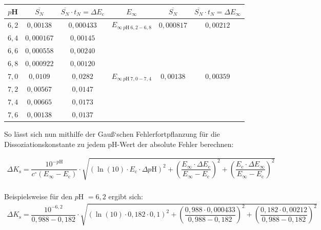 \documentclass[12pt,a4paper,titlepage,headinclude,bibtotoc]{scrartcl}
\begin{document}
\begin{table} [h]
\centering
\begin{tabular} {|c|c|c||c|c|c|}
  \hline
  $p$H & $\overline{S_N}$ & $\overline{S_N} \cdot t_{N} = \Delta E_{\mathrm{c}} $ & $E_{\infty}$ & $\overline{S_N}$ & $\overline{S_N} \cdot t_{N} = \Delta E_{\infty} $ \\\hline\hline
  $6,2$ & $0,00138$& $0,000433$&$E_{\infty {~}p\mathrm{H}{~} 6,2-6,8}$ &$0,000817$ & $0,00212$\\
  $6,4$& $0,000167$& $0,00145$&&& \\
  $6,6$& $0,000558$& $0,00240$&&&\\
  $6,8$& $0,000922$&$0,00120$&&&\\\hline\hline
  $7,0$& $0,0109$& $0,0282$ &$E_{\infty {~}p\mathrm{H}{~} 7,0-7,4}$&$0,00138$& $0,00359$\\
  $7,2$& $0,00567$& $0,0147$&&&\\
  $7,4$& $0,00665$&$0,0173$&&&\\
  $7,6$& $0,00138$&$0,0137$&&&\\\hline
  
 \end{tabular}
\end{table}

So lässt sich nun mithilfe der Gauß`schen Fehlerfortpflanzung für die Dissoziationskonstante zu jedem pH-Wert der absolute Fehler berechnen:

\begin{align}
\Delta K_{\mathrm{s}} = \dfrac{10^{-p\mathrm{H}}}{c^{\circ}(E_{\infty}-E_{\mathrm{c}})} \cdot \sqrt{(\ln (10) \cdot E_{\mathrm{c}} \cdot \Delta p\mathrm{H})^2 + \left(\dfrac{E_{\infty} \cdot \Delta E_{\mathrm{c}}}{E_{\infty}-E_{\mathrm{c}}}\right)^2 + \left(\dfrac{E_{\mathrm{c}} \cdot \Delta E_{\infty}}{E_{\infty}-E_{\mathrm{c}} }\right)^2}
\end{align}
\\
Beispielsweise für den $p$H $= 6,2$ ergibt sich:\\
\begin{align*}
\Delta K_{\mathrm{s}} = \dfrac{10^{\mathrm{-6,2}}}{0,988-0,182} \cdot \sqrt{(\ln (10) \cdot 0,182 \cdot 0,1)^2 + \left(\dfrac{0,988 \cdot 0,000433 }{0,988-0,182}\right)^2 + \left(\dfrac{0,182 \cdot 0,00212 }{0,988-0,182}\right)^2}
\end{align*}
\vspace{3cm}
\end{document}

